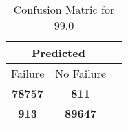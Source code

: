 \begin{table}[] 
\label{Table: Prediction Accuracy-DMD99.0OnlySunEKF-ignoreReflection-Reflection} 
\caption{Confusion Matric for 99.0} 
\centering 
\begin{tabular} 
 {@{}ccc@{}} 
\toprule 
\multicolumn{2}{c}{\textbf{Predicted}}
 \\ \midrule 
\multicolumn{1}{|c|}{Failure} & 
\multicolumn{1}{c|}{No Failure}
 \\ \midrule 
\multicolumn{1}{|c|}{\color{green}\textbf{78757}} & 
\multicolumn{1}{c|}{\color{red}\textbf{811}}
 \\ \midrule 
\multicolumn{1}{|c|}{\color{red}\textbf{913}} & 
\multicolumn{1}{c|}{\color{green}\textbf{89647}}
 \\ \bottomrule 
\end{tabular} 
\end{table} 
